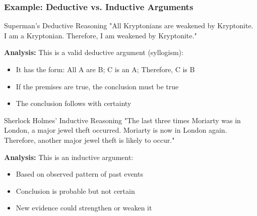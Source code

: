 \documentclass{beamer}
\begin{document}
\begin{frame}
    \frametitle{Example: Deductive vs. Inductive Arguments}
    
    \begin{exampleblock}{Superman's Deductive Reasoning}
    \scriptsize
        "All Kryptonians are weakened by Kryptonite. I am a Kryptonian. Therefore, I am weakened by Kryptonite."
        
        \textbf{Analysis:} This is a valid deductive argument (syllogism):
        \begin{itemize}
            \item It has the form: All A are B; C is an A; Therefore, C is B
            \item If the premises are true, the conclusion must be true
            \item The conclusion follows with certainty
        \end{itemize}
    \end{exampleblock}
    
    \begin{exampleblock}{Sherlock Holmes' Inductive Reasoning}
    \scriptsize
        "The last three times Moriarty was in London, a major jewel theft occurred. Moriarty is now in London again. Therefore, another major jewel theft is likely to occur."
        
        \textbf{Analysis:} This is an inductive argument:
        \begin{itemize}
            \item Based on observed pattern of past events
            \item Conclusion is probable but not certain
            \item New evidence could strengthen or weaken it
        \end{itemize}
    \end{exampleblock}
\end{frame}
\end{document}
